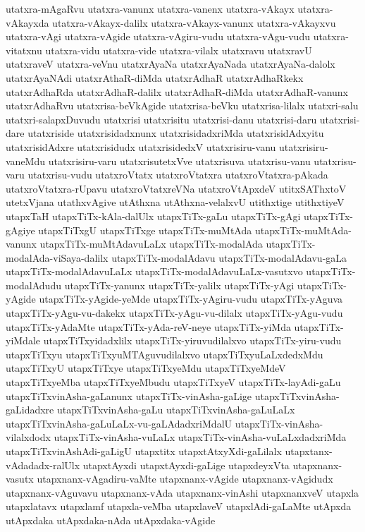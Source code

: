 {utatxra-mAgaRvu
utatxra-vanunx
utatxra-vanenx
utatxra-vAkayx
utatxra-vAkayxda
utatxra-vAkayx-dalilx
utatxra-vAkayx-vanunx
utatxra-vAkayxvu
utatxra-vAgi
utatxra-vAgide
utatxra-vAgiru-vudu
utatxra-vAgu-vudu
utatxra-vitatxnu
utatxra-vidu
utatxra-vide
utatxra-vilalx
utatxravu
utatxravU
utatxraveV
utatxra-veVnu
utatxrAyaNa
utatxrAyaNada
utatxrAyaNa-dalolx
utatxrAyaNAdi
utatxrAthaR-diMda
utatxrAdhaR
utatxrAdhaRkekx
utatxrAdhaRda
utatxrAdhaR-dalilx
utatxrAdhaR-diMda
utatxrAdhaR-vanunx
utatxrAdhaRvu
utatxrisa-beVkAgide
utatxrisa-beVku
utatxrisa-lilalx
utatxri-salu
utatxri-salapxDuvudu
utatxrisi
utatxrisitu
utatxrisi-danu
utatxrisi-daru
utatxrisi-dare
utatxriside
utatxrisidadxnunx
utatxrisidadxriMda
utatxrisidAdxyitu
utatxrisidAdxre
utatxrisidudx
utatxrisidedxV
utatxrisiru-vanu
utatxrisiru-vaneMdu
utatxrisiru-varu
utatxrisutetxVve
utatxrisuva
utatxrisu-vanu
utatxrisu-varu
utatxrisu-vudu
utatxroVtatx
utatxroVtatxra
utatxroVtatxra-pAkada
utatxroVtatxra-rUpavu
utatxroVtatxreVNa
utatxroVtApxdeV
utitxSAThxtoV
utetxVjana
utathxvAgive
utAthxna
utAthxna-velalxvU
utithxtige
utithxtiyeV
utapxTaH
utapxTiTx-kAla-dalUlx
utapxTiTx-gaLu
utapxTiTx-gAgi
utapxTiTx-gAgiye
utapxTiTxgU
utapxTiTxge
utapxTiTx-muMtAda
utapxTiTx-muMtAda-vanunx
utapxTiTx-muMtAdavuLaLx
utapxTiTx-modalAda
utapxTiTx-modalAda-viSaya-dalilx
utapxTiTx-modalAdavu
utapxTiTx-modalAdavu-gaLa
utapxTiTx-modalAdavuLaLx
utapxTiTx-modalAdavuLaLx-vasutxvo
utapxTiTx-modalAdudu
utapxTiTx-yanunx
utapxTiTx-yalilx
utapxTiTx-yAgi
utapxTiTx-yAgide
utapxTiTx-yAgide-yeMde
utapxTiTx-yAgiru-vudu
utapxTiTx-yAguva
utapxTiTx-yAgu-vu-dakekx
utapxTiTx-yAgu-vu-dilalx
utapxTiTx-yAgu-vudu
utapxTiTx-yAdaMte
utapxTiTx-yAda-reV-neye
utapxTiTx-yiMda
utapxTiTx-yiMdale
utapxTiTxyidadxlilx
utapxTiTx-yiruvudilalxvo
utapxTiTx-yiru-vudu
utapxTiTxyu
utapxTiTxyuMTAguvudilalxvo
utapxTiTxyuLaLxdedxMdu
utapxTiTxyU
utapxTiTxye
utapxTiTxyeMdu
utapxTiTxyeMdeV
utapxTiTxyeMba
utapxTiTxyeMbudu
utapxTiTxyeV
utapxTiTx-layAdi-gaLu
utapxTiTxvinAsha-gaLanunx
utapxTiTx-vinAsha-gaLige
utapxTiTxvinAsha-gaLidadxre
utapxTiTxvinAsha-gaLu
utapxTiTxvinAsha-gaLuLaLx
utapxTiTxvinAsha-gaLuLaLx-vu-gaLAdadxriMdalU
utapxTiTx-vinAsha-vilalxdodx
utapxTiTx-vinAsha-vuLaLx
utapxTiTx-vinAsha-vuLaLxdadxriMda
utapxTiTxvinAshAdi-gaLigU
utapxtitx
utapxtAtxyXdi-gaLilalx
utapxtanx-vAdadadx-ralUlx
utapxtAyxdi
utapxtAyxdi-gaLige
utapxdeyxVta
utapxnanx-vasutx
utapxnanx-vAgadiru-vaMte
utapxnanx-vAgide
utapxnanx-vAgidudx
utapxnanx-vAguvavu
utapxnanx-vAda
utapxnanx-vinAshi
utapxnanxveV
utapxla
utapxlatavx
utapxlamf
utapxla-veMba
utapxlaveV
utapxlAdi-gaLaMte
utApxda
utApxdaka
utApxdaka-nAda
utApxdaka-vAgide
}

